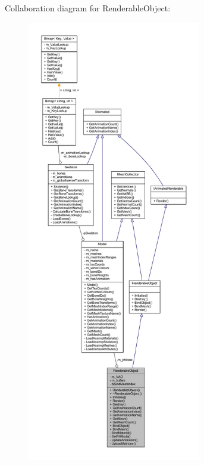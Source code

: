 Collaboration diagram for Renderable\+Object\+:
\nopagebreak
\begin{figure}[H]
\begin{center}
\leavevmode
\includegraphics[height=550pt]{class_renderable_object__coll__graph}
\end{center}
\end{figure}
